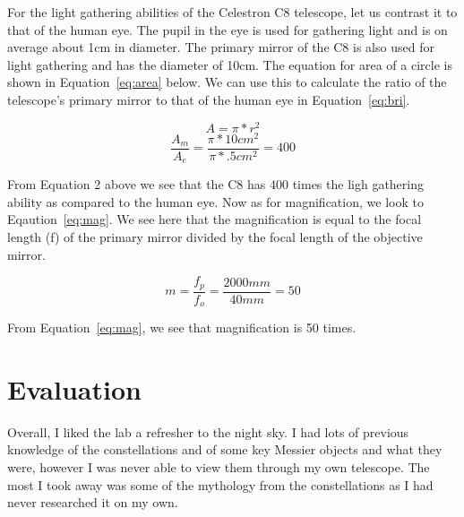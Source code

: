 \documentclass{article}
\begin{document}
For the light gathering abilities of the Celestron C8 telescope, let us contrast it to that of the human eye. The pupil in the eye is used for
gathering light and is on average about 1cm in diameter. The primary mirror of the C8 is also used for light gathering and has 
the diameter of 10cm.  The equation for area of a circle is shown in Equation~\ref{eq:area} below. We can use this to calculate the ratio of the
telescope's primary mirror to that of the human eye in Equation~\ref{eq:bri}.

\begin{equation} \label{eq:area}
A = \pi * r^2
\end{equation}
\begin{equation} \label{eq:bri}
{\frac{A_m}{A_e}} = {\frac{\pi * 10cm^2}{\pi * .5cm^2}} = 400
\end{equation}

From Equation 2 above we see that the C8 has 400 times the ligh gathering ability as compared to the human eye. Now as for
magnification, we look to Eqaution~\ref{eq:mag}. We see here that the magnification is equal to the focal length (f) of the primary
mirror divided by the focal length of the objective mirror.

\begin{equation} \label{eq:mag}
m = {\frac{f_p}{f_o}} = {\frac{2000mm}{40mm}} = 50
\end{equation}

From Equation~\ref{eq:mag}, we see that magnification is 50 times.\\



\section{Evaluation}
Overall, I liked the lab a refresher to the night sky. I had lots of previous knowledge of the constellations and of some key Messier
objects and what they were, however I was never able to view them through my own telescope. The most I took away was some of
the mythology from the constellations as I had never researched it on my own.


\end{document}
